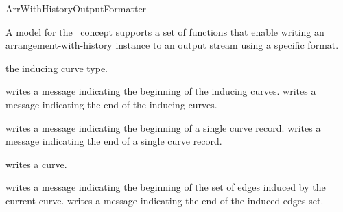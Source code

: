
\ccRefPageBegin

\begin{ccRefConcept}{ArrWithHistoryOutputFormatter}

A model for the \ccRefName\ concept supports a set of functions that enable
writing an arrangement-with-history instance to an output stream using a
specific format.

\ccRefines
{}

\ccTypes


    {the inducing curve type.}




    {writes a message indicating the beginning of the inducing curves.}
\ccGlue
{}
    {writes a message indicating the end of the inducing curves.}

    {writes a message indicating the beginning of a single curve record.}
\ccGlue
{}
    {writes a message indicating the end of a single curve record.}

    {writes a curve.}

    {writes a message indicating the beginning of the set of edges
     induced by the current curve.}
\ccGlue
{}
    {writes a message indicating the end of the induced edges set.}

\ccHasModels


\end{ccRefConcept}

\ccRefPageEnd
